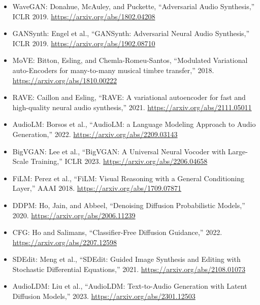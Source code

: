 \documentclass[11pt]{article}
\begin{document}
\begin{itemize}
\item WaveGAN: Donahue, McAuley, and Puckette, ``Adversarial Audio Synthesis,'' ICLR 2019. \url{https://arxiv.org/abs/1802.04208}
\item GANSynth: Engel et al., ``GANSynth: Adversarial Neural Audio Synthesis,'' ICLR 2019. \url{https://arxiv.org/abs/1902.08710}
\item MoVE: Bitton, Esling, and Chemla-Romeu-Santos, ``Modulated Variational auto-Encoders for many-to-many musical timbre transfer,'' 2018. \url{https://arxiv.org/abs/1810.00222}
\item RAVE: Caillon and Esling, ``RAVE: A variational autoencoder for fast and high-quality neural audio synthesis,'' 2021. \url{https://arxiv.org/abs/2111.05011}
\item AudioLM: Borsos et al., ``AudioLM: a Language Modeling Approach to Audio Generation,'' 2022. \url{https://arxiv.org/abs/2209.03143}
\item BigVGAN: Lee et al., ``BigVGAN: A Universal Neural Vocoder with Large-Scale Training,'' ICLR 2023. \url{https://arxiv.org/abs/2206.04658}
\item FiLM: Perez et al., ``FiLM: Visual Reasoning with a General Conditioning Layer,'' AAAI 2018. \url{https://arxiv.org/abs/1709.07871}
\item DDPM: Ho, Jain, and Abbeel, ``Denoising Diffusion Probabilistic Models,'' 2020. \url{https://arxiv.org/abs/2006.11239}
\item CFG: Ho and Salimans, ``Classifier-Free Diffusion Guidance,'' 2022. \url{https://arxiv.org/abs/2207.12598}
\item SDEdit: Meng et al., ``SDEdit: Guided Image Synthesis and Editing with Stochastic Differential Equations,'' 2021. \url{https://arxiv.org/abs/2108.01073}
\item AudioLDM: Liu et al., ``AudioLDM: Text-to-Audio Generation with Latent Diffusion Models,'' 2023. \url{https://arxiv.org/abs/2301.12503}
\end{itemize}
\end{document}
